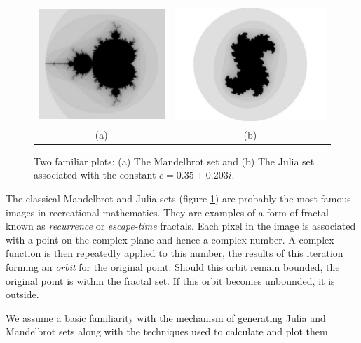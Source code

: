 \documentclass{elsart}
\theoremstyle{definition}
\begin{document}
\begin{figure}
\centering
\begin{tabular}{c@{$\quad$}c}
\includegraphics[height=0.35\textwidth]{figures/eud_mandel_64it} 
 & \includegraphics[height=0.35\textwidth]{figures/eud_julia_64it_0d35_0d203} \\
                          (a) & (b)
\end{tabular}
\caption{\label{fig:euclidean_sets}Two familiar plots: (a) The Mandelbrot set and
  (b) The Julia set associated with the constant $c = 0.35 + 0.203i$.}
\end{figure}


The classical Mandelbrot and Julia sets (figure \ref{fig:euclidean_sets}) are
probably the most famous images in recreational mathematics.  They are examples
of a form of fractal known as \emph{recurrence} or \emph{escape-time} fractals.
Each pixel in the image is associated with a point on the complex plane and
hence a complex number. A complex function is then repeatedly applied to this
number, the results of this iteration forming an \emph{orbit} for the original
point.  Should this orbit remain bounded, the original point is within the
fractal set.  If this orbit becomes unbounded, it is outside.

We assume a basic familiarity with the mechanism of generating Julia and
Mandelbrot sets along with the techniques used to calculate and plot them.
\end{document}
